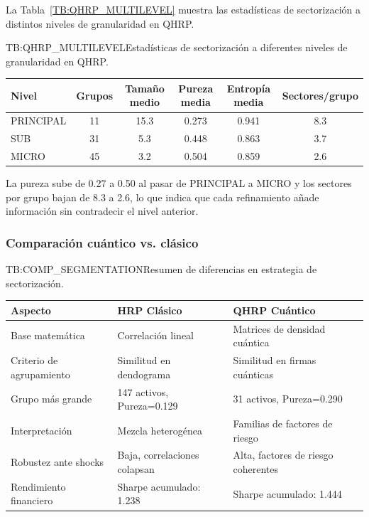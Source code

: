 La Tabla~\ref{TB:QHRP_MULTILEVEL} muestra las estadísticas de sectorización a distintos niveles de granularidad en \gls{QHRP}.

\begin{table}[Sectorización multinivel en QHRP]{TB:QHRP_MULTILEVEL}{Estadísticas de sectorización a diferentes niveles de granularidad en QHRP.}
\begin{tabular}{lccccc}
\hline
\textbf{Nivel} & \textbf{Grupos} & \textbf{Tamaño medio} & \textbf{Pureza media} & \textbf{Entropía media} & \textbf{Sectores/grupo} \\
\hline
PRINCIPAL & 11 & 15.3 & 0.273 & 0.941 & 8.3 \\
SUB & 31 & 5.3 & 0.448 & 0.863 & 3.7 \\
MICRO & 45 & 3.2 & 0.504 & 0.859 & 2.6 \\
\hline
\end{tabular}
\end{table}

La pureza sube de 0.27 a 0.50 al pasar de PRINCIPAL a MICRO y los sectores por grupo bajan de 8.3 a 2.6, lo que indica que cada refinamiento añade información sin contradecir el nivel anterior.

\subsubsection{Comparación cuántico vs. clásico}
\label{subsubsec:comparacion_quantico_clasico}

\begin{table}[Comparación de sectorización: HRP Clásico vs QHRP]{TB:COMP_SEGMENTATION}{Resumen de diferencias en estrategia de sectorización.}
\begin{tabular}{lll}
\hline
\textbf{Aspecto} & \textbf{HRP Clásico} & \textbf{QHRP Cuántico} \\
\hline
Base matemática & Correlación lineal & Matrices de densidad cuántica \\
\hline
Criterio de agrupamiento & Similitud en dendograma & Similitud en firmas cuánticas \\
\hline
Grupo más grande & 147 activos, Pureza=0.129 & 31 activos, Pureza=0.290 \\
\hline
Interpretación & Mezcla heterogénea & Familias de factores de riesgo \\
\hline
Robustez ante shocks & Baja, correlaciones colapsan & Alta, factores de riesgo coherentes \\
\hline
Rendimiento financiero & Sharpe acumulado: 1.238 & Sharpe acumulado: 1.444 \\
\hline
\end{tabular}
\end{table}

